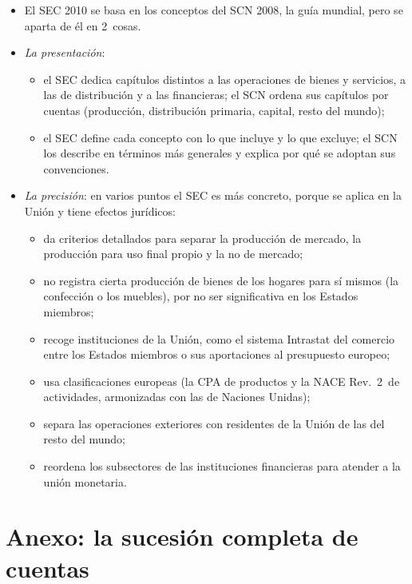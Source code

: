 \documentclass[11pt]{article}
\begin{document}
\begin{itemize}
\item El SEC 2010 se basa en los conceptos del SCN 2008, la guía mundial, pero se aparta de él en 2~cosas\nocite{SEC2010}.
\item \emph{La presentación}:
  \begin{itemize}
  \item el SEC dedica capítulos distintos a las operaciones de bienes y servicios, a las de distribución y a las financieras; el SCN ordena sus capítulos por cuentas (producción, distribución primaria, capital, resto del mundo);
  \item el SEC define cada concepto con lo que incluye y lo que excluye; el SCN los describe en términos más generales y explica por qué se adoptan sus convenciones.
  \end{itemize}
\item \emph{La precisión}: en varios puntos el SEC es más concreto, porque se aplica en la Unión y tiene efectos jurídicos:
  \begin{itemize}
  \item da criterios detallados para separar la producción de mercado, la producción para uso final propio y la no de mercado;
  \item no registra cierta producción de bienes de los hogares para sí mismos (la confección o los muebles), por no ser significativa en los Estados miembros;
  \item recoge instituciones de la Unión, como el sistema Intrastat del comercio entre los Estados miembros o sus aportaciones al presupuesto europeo;
  \item usa clasificaciones europeas (la CPA de productos y la NACE Rev.~2~de actividades, armonizadas con las de Naciones Unidas);
  \item separa las operaciones exteriores con residentes de la Unión de las del resto del mundo;
  \item reordena los subsectores de las instituciones financieras para atender a la unión monetaria.
  \end{itemize}
\end{itemize}

\clearpage
\section{Anexo: la sucesión completa de cuentas}\label{anexo:sucesion}
\end{document}
